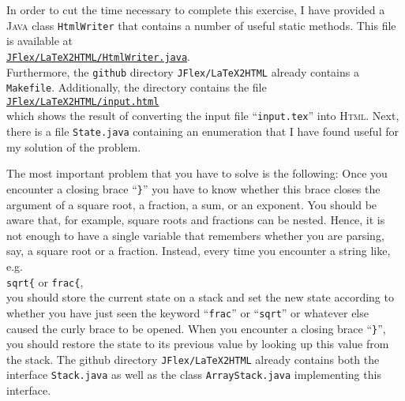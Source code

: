 In order to cut the time necessary to complete this exercise, I have provided a \textsc{Java} class
\texttt{HtmlWriter} that contains a number of useful static methods.  This file is available at
\\[0.2cm]
\hspace*{1.3cm}
\href{https://github.com/karlstroetmann/Formal-Languages/tree/master/JFlex/LaTeX2HTML/HtmlWriter.java}{\texttt{JFlex/LaTeX2HTML/HtmlWriter.java}}.
\\[0.2cm] 
Furthermore, the \texttt{github} directory \texttt{JFlex/LaTeX2HTML} already contains a \texttt{Makefile}.
Additionally, the directory contains the file
\\[0.2cm]
\hspace*{1.3cm}
\href{https://github.com/karlstroetmann/Formal-Languages/tree/master/JFlex/LaTeX2HTML/input.html}{\texttt{JFlex/LaTeX2HTML/input.html}}
\\[0.2cm]
which shows the result of converting the input file ``\texttt{input.tex}'' into \textsc{Html}.
Next, there is a file \texttt{State.java} containing an enumeration that I have found useful for my
solution of the problem.

\remarkEng
The most important problem that you have to solve is the following:  Once you encounter a closing brace
``\texttt{\}}'' you have to know whether this brace closes the argument of a square root, a
fraction, a sum, or an exponent.  You should be aware that, for example, square roots and fractions
can be nested.  Hence, it is not enough to have a single variable that remembers whether you are
parsing, say, a square root or a fraction.  Instead, every time you encounter a string like, e.g.
\\[0.2cm]
\hspace*{1.3cm}
\texttt{sqrt\{} \quad or \quad \texttt{frac\{},
\\[0.2cm]
you should store the current state on a stack and set the new state according to whether you have just seen the
keyword ``\texttt{frac}'' or ``\texttt{sqrt}'' or whatever else caused the
curly brace to be opened.  When you encounter a closing brace ``\texttt{\}}'', you should 
restore the state to its previous value by looking up this value from the stack.  The github directory
\texttt{JFlex/LaTeX2HTML} already contains both the interface \texttt{Stack.java} as well as the
class \texttt{ArrayStack.java} implementing this interface.
\eox




